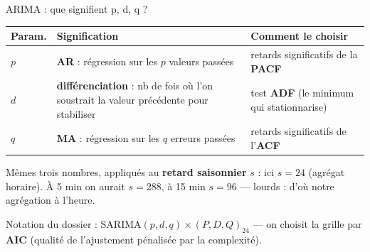 \begin{frame}{ARIMA : que signifient p, d, q ?}
\begin{center}\small
\begin{tabular}{@{}p{1.4cm}p{5.6cm}p{4.6cm}@{}}
\toprule
\textbf{Param.} & \textbf{Signification} & \textbf{Comment le choisir}\\
\midrule
$p$ & \textbf{AR} : régression sur les $p$ valeurs passées & retards
significatifs de la \textbf{PACF}\\
\addlinespace[1pt]
$d$ & \textbf{différenciation} : nb de fois où l'on soustrait la valeur
précédente pour stabiliser & test \textbf{ADF} (le minimum qui stationnarise)\\
\addlinespace[1pt]
$q$ & \textbf{MA} : régression sur les $q$ erreurs passées & retards
significatifs de l'\textbf{ACF}\\
\bottomrule
\end{tabular}
\end{center}
\vspace{1mm}
\begin{ebox}
Mêmes trois nombres, appliqués au \textbf{retard saisonnier} $s$ : ici
$s = 24$ (agrégat horaire). À 5 min on aurait $s = 288$, à 15 min
$s = 96$ --- lourds : d'où notre agrégation à l'heure.
\end{ebox}
\vspace{1mm}
\begin{center}\small
Notation du dossier : SARIMA$(p,d,q)\times(P,D,Q)_{24}$ --- on choisit la
grille par \textbf{AIC} (qualité de l'ajustement pénalisée par la
complexité).
\end{center}
\end{frame}

